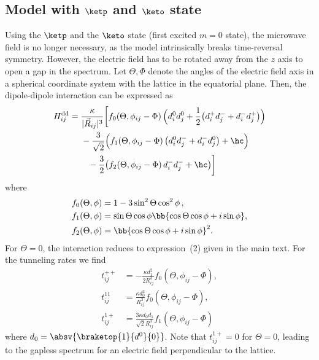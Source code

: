 \subsection{Model with \texorpdfstring{$\ketp$}{+} and \texorpdfstring{$\keto$}{1} state}
Using the $\ketp$ and the $\keto$ state (first excited $m=0$ state), the microwave field is no longer necessary, as the model intrinsically breaks time-reversal symmetry. However, the electric field has to be rotated away from the $z$ axis to open a gap in the spectrum. Let $\Theta, \Phi$ denote the angles of the electric field axis in a spherical coordinate system with the lattice in the equatorial plane.
Then, the dipole-dipole interaction can be expressed as
\begin{align}
    H^\text{dd}_{ij} &= \frac{\kappa}{|\vec{R}_{ij}|^3} \bigg[ f_0(\Theta, \phi_{ij} - \Phi)\, \Big( d^0_i d^0_j + \frac{1}{2}\big(d^+_i d^-_j + d^-_i d^+_j\big) \Big) \\
                     &\hspace{1.38em} -\frac{3}{\sqrt{2}} \Big( f_1(\Theta, \phi_{ij} - \Phi) \, \big(d^0_i d^-_j + d^-_i d^0_j\big) + \hc \Big) \\
                     &\hspace{2.2em} -\frac{3}{2} \big( f_2(\Theta, \phi_{ij} - \Phi) \, d^-_i d^-_j + \hc \big ) \bigg]
\end{align}
where
\begin{align}
    f_0(\Theta, \phi) &= 1-3\sin^2 \Theta \cos^2 \phi\, , \\
    f_1(\Theta, \phi) &= \sin \Theta \cos \phi \bb{\cos \Theta \cos \phi + i \sin \phi} , \\
    f_2(\Theta, \phi) &= \bb{\cos\Theta \cos\phi + i \sin \phi}^2 .
\end{align}
For $\Theta=0$, the interaction reduces to expression~(2) given in the main text.
For the tunneling rates we find
\begin{align}
    t^{++}_{ij} &= -\frac{\kappa d_{1}^2}{2R_{ij}^3} f_0(\Theta, \phi_{ij} - \Phi), \\
    t^{11}_{ij} &= \frac{\kappa d_{0}^2}{R_{ij}^3} f_0(\Theta, \phi_{ij} - \Phi), \\
    t^{1+}_{ij} &= \frac{3\kappa d_{0}d_{1}}{\sqrt{2}R_{ij}^3} f_1(\Theta, \phi_{ij} - \Phi)
\end{align}
where $d_0=\absv{\braketop{1}{d^0}{0}}$. Note that $t^{1+}_{ij}=0$ for $\Theta=0$, leading to the gapless spectrum for an electric field perpendicular to the lattice.

